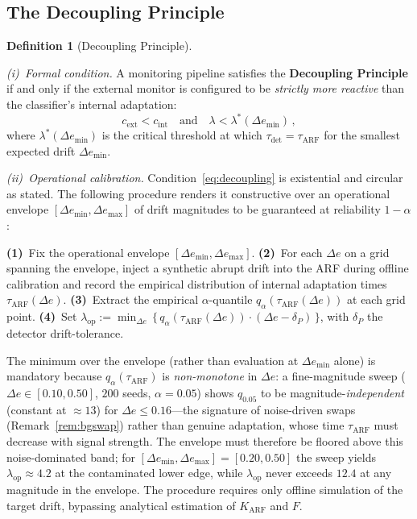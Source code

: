 \documentclass[10pt,conference]{IEEEtran}
\theoremstyle{definition}
\newtheorem{definition}[theorem]{Definition}
\begin{document}
\subsection{The Decoupling Principle}\label{sec:decoupling}

\begin{definition}[Decoupling Principle]\label{def:decoupling}

  \smallskip
  \emph{(i)~Formal condition.} A monitoring pipeline satisfies the \textbf{Decoupling Principle} if and only if the external monitor is configured to be \emph{strictly more reactive} than the classifier's internal adaptation:
  \begin{equation}\label{eq:decoupling}
    c_{\mathrm{ext}} < c_{\mathrm{int}} \quad \text{and} \quad \lambda < \lambda^*(\Delta e_{\min})\,,
  \end{equation}
  where $\lambda^*(\Delta e_{\min})$ is the critical threshold at which $\tau_{\mathrm{det}} = \tau_{\mathrm{ARF}}$ for the smallest expected drift $\Delta e_{\min}$.

  \smallskip
  \emph{(ii)~Operational calibration.} Condition~\eqref{eq:decoupling} is existential and circular as stated. The following procedure renders it constructive over an operational envelope $[\Delta e_{\min}, \Delta e_{\max}]$ of drift magnitudes to be guaranteed at reliability $1-\alpha$:

  \textbf{(1)}~Fix the operational envelope $[\Delta e_{\min}, \Delta e_{\max}]$. \textbf{(2)}~For each $\Delta e$ on a grid spanning the envelope, inject a synthetic abrupt drift into the ARF during offline calibration and record the empirical distribution of internal adaptation times $\tau_{\mathrm{ARF}}(\Delta e)$. \textbf{(3)}~Extract the empirical $\alpha$-quantile $q_{\alpha}(\tau_{\mathrm{ARF}}(\Delta e))$ at each grid point. \textbf{(4)}~Set $\lambda_{\mathrm{op}} := \min_{\Delta e}\,\{\, q_{\alpha}(\tau_{\mathrm{ARF}}(\Delta e))\cdot(\Delta e - \delta_P) \,\}$, with $\delta_P$ the detector drift-tolerance.

  The minimum over the envelope (rather than evaluation at $\Delta e_{\min}$ alone) is mandatory because $q_{\alpha}(\tau_{\mathrm{ARF}})$ is \emph{non-monotone} in $\Delta e$: a fine-magnitude sweep ($\Delta e \in [0.10,0.50]$, $200$ seeds, $\alpha = 0.05$) shows $q_{0.05}$ to be magnitude-\emph{independent} (constant at $\approx 13$) for $\Delta e \le 0.16$---the signature of noise-driven swaps (Remark~\ref{rem:bgswap}) rather than genuine adaptation, whose time $\tau_{\mathrm{ARF}}$ must decrease with signal strength. The envelope must therefore be floored above this noise-dominated band; for $[\Delta e_{\min}, \Delta e_{\max}] = [0.20, 0.50]$ the sweep yields $\lambda_{\mathrm{op}} \approx 4.2$ at the contaminated lower edge, while $\lambda_{\mathrm{op}}$ never exceeds $12.4$ at any magnitude in the envelope. The procedure requires only offline simulation of the target drift, bypassing analytical estimation of $K_{\mathrm{ARF}}$ and $F$.
\end{definition}
\end{document}
